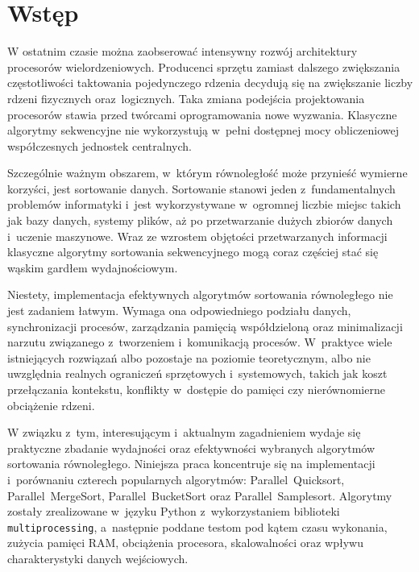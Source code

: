 \cleardoublepage
\chapter*{Wstęp}


W ostatnim czasie można zaobserować intensywny rozwój architektury procesorów wielordzeniowych. Producenci sprzętu zamiast dalszego 
zwiększania częstotliwości taktowania pojedynczego rdzenia decydują się na zwiększanie liczby rdzeni fizycznych oraz~logicznych. 
Taka zmiana podejścia projektowania procesorów stawia przed twórcami oprogramowania nowe wyzwania. Klasyczne algorytmy sekwencyjne 
nie wykorzystują w~pełni dostępnej mocy obliczeniowej współczesnych jednostek centralnych.

Szczególnie ważnym obszarem, w~którym równoległość może przynieść wymierne korzyści, jest sortowanie danych. Sortowanie stanowi 
jeden z~fundamentalnych problemów informatyki i~jest wykorzystywane w~ogromnej liczbie miejsc takich jak bazy danych, systemy plików, 
aż po przetwarzanie dużych zbiorów danych i~uczenie maszynowe. Wraz ze wzrostem objętości przetwarzanych informacji klasyczne algorytmy 
sortowania sekwencyjnego mogą coraz częściej stać się wąskim gardłem wydajnościowym.

Niestety, implementacja efektywnych algorytmów sortowania równoległego nie jest zadaniem łatwym. Wymaga ona odpowiedniego podziału danych, 
synchronizacji procesów, zarządzania pamięcią współdzieloną oraz minimalizacji narzutu związanego z~tworzeniem i~komunikacją procesów. 
W~praktyce wiele istniejących rozwiązań albo pozostaje na poziomie teoretycznym, albo nie uwzględnia realnych ograniczeń sprzętowych 
i~systemowych, takich jak koszt przełączania kontekstu, konflikty w~dostępie do pamięci czy nierównomierne obciążenie rdzeni.

W związku z~tym, interesującym i~aktualnym zagadnieniem wydaje się praktyczne zbadanie wydajności oraz efektywności wybranych 
algorytmów sortowania równoległego. Niniejsza praca koncentruje się na implementacji i~porównaniu czterech popularnych 
algorytmów: Parallel~Quicksort, Parallel~MergeSort, Parallel~BucketSort oraz Parallel~Samplesort. 
Algorytmy zostały zrealizowane w~języku Python z~wykorzystaniem biblioteki \texttt{multiprocessing}, a~następnie poddane testom 
pod kątem czasu wykonania, zużycia pamięci RAM, obciążenia procesora, skalowalności oraz wpływu charakterystyki danych wejściowych.

